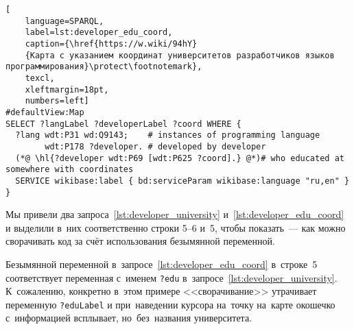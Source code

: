 \begin{lstlisting}[
	language=SPARQL,
	label=lst:developer_edu_coord,
	caption={\href{https://w.wiki/94hY}
    {Карта с указанием координат университетов разработчиков языков программирования}\protect\footnotemark},
	texcl,
    xleftmargin=18pt,
    numbers=left]
#defaultView:Map
SELECT ?langLabel ?developerLabel ?coord WHERE {
  ?lang wdt:P31 wd:Q9143;    # instances of programming language
        wdt:P178 ?developer. # developed by developer
  (*@ \hl{?developer wdt:P69 [wdt:P625 ?coord].} @*)# who educated at somewhere with coordinates
  SERVICE wikibase:label { bd:serviceParam wikibase:language "ru,en" }
}
\end{lstlisting}

Мы привели два запроса~\ref{lst:developer_university} и~\ref{lst:developer_edu_coord} 
и выделили в~них соответственно строки 5--6 и~5, 
чтобы показать~--- как можно сворачивать код за счёт использования безымянной переменной. 

Безымянной переменной в~запросе~\ref{lst:developer_edu_coord} в~строке~5 
соответствует переменная с~именем \lstinline|?edu| в~запросе~\ref{lst:developer_university}. 
К~сожалению, конкретно в~этом примере <<сворачивание>> утрачивает переменную \lstinline|?eduLabel| 
и при~наведении курсора на~точку на~карте окошечко с~информацией всплывает, но~без~названия университета.





